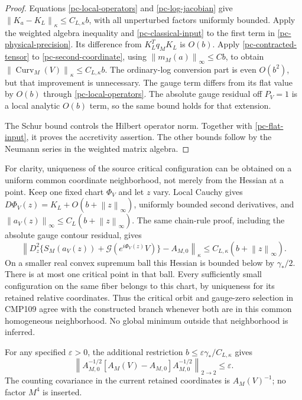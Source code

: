 \documentclass[11pt]{article}
\theoremstyle{remark}
\newcommand{\norm}[1]{\left\|#1\right\|}
\begin{document}
\begin{proof}
Equations \eqref{pc-local-operators} and
\eqref{pc-log-jacobian} give
$\norm{K_a-K_L}_\kappa\le C_{L,\kappa}b$, with all
unperturbed factors uniformly bounded. Apply the weighted
algebra inequality and \eqref{pc-classical-input} to the
first term in \eqref{pc-physical-precision}. Its difference
from $K_L^Tq_MK_L$ is $O(b)$. Apply
\eqref{pc-contracted-tensor} to
\eqref{pc-second-coordinate}, using
$\norm{m_M(a)}_\infty\le Cb$, to obtain
$\norm{\operatorname{Curv}_M(V)}_\kappa\le C_{L,\kappa}b$.
The ordinary-log conversion part is even $O(b^2)$, but that
improvement is unnecessary. The gauge term differs from its
flat value by $O(b)$ through \eqref{pc-local-operators}.
The absolute gauge residual off $P_V=1$ is a local analytic
$O(b)$ term, so the same bound holds for that extension.

The Schur bound controls the Hilbert operator norm. Together
with \eqref{pc-flat-input}, it proves the accretivity assertion.
The other bounds follow by the Neumann series in the weighted
matrix algebra.
\end{proof}

For clarity, uniqueness of the source critical configuration
can be obtained on a uniform common coordinate neighborhood,
not merely from the Hessian at a point. Keep one fixed chart
$\Phi_V$ and let $z$ vary. Local Cauchy gives
$D\Phi_V(z)=K_L+O(b+\norm z_\infty)$, uniformly bounded
second derivatives, and
$\norm{a_V(z)}_\infty\le C_L(b+\norm z_\infty)$.
The same chain-rule proof, including the absolute gauge
contour residual, gives
\begin{equation}\label{pc-uniform-convexity}
 \left\|D_z^2\{S_M(a_V(z))+
       \mathcal G(e^{i\Phi_V(z)}V)\}-A_{M,0}\right\|_\kappa
       \le C_{L,\kappa}(b+\norm z_\infty).
\end{equation}
On a smaller real convex supremum ball this Hessian is bounded
below by $\gamma_*/2$. There is at most one critical point in
that ball. Every sufficiently small configuration on the same
fiber belongs to this chart, by uniqueness for its retained
relative coordinates. Thus the critical orbit and gauge-zero
selection in CMP109 agree with the constructed branch whenever
both are in this common homogeneous neighborhood. No global
minimum outside that neighborhood is inferred.

For any specified $\varepsilon>0$, the additional restriction
$b\le\varepsilon\gamma_*/C_{L,\kappa}$ gives
\begin{equation}\label{pc-relative-precision}
 \norm{A_{M,0}^{-1/2}[A_M(V)-A_{M,0}]A_{M,0}^{-1/2}}_{2\to2}
       \le\varepsilon.
\end{equation}
The counting covariance in the current retained coordinates
is $A_M(V)^{-1}$; no factor $M^4$ is inserted.
\end{document}

